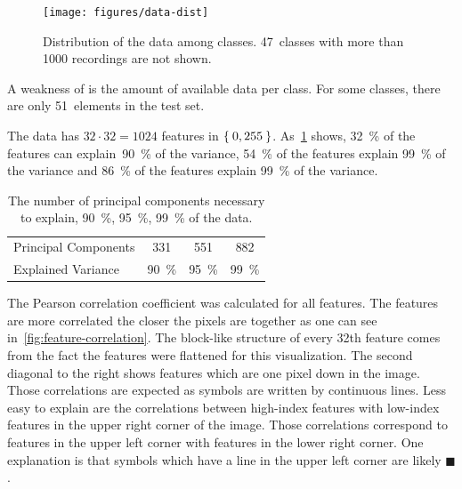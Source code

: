 \begin{figure}[h]
    \centering
    \texttt{[image: figures/data-dist]}
    \caption{Distribution of the data among classes. 47~classes with
             more than \num{1000} recordings are not shown.}
    \label{fig:class-data-distribution}
\end{figure}

A weakness of \dbNameVersion{} is the amount of available data per class. For
some classes, there are only 51~elements in the test set.

The data has $32\cdot 32 = 1024$ features in $\Set{0, 255}$.
As~\cref{table:pca-explained-variance} shows, \SI{32}{\percent} of the features
can explain~\SI{90}{\percent} of the variance, \SI{54}{\percent} of the
features explain \SI{99}{\percent} of the variance and \SI{86}{\percent} of the
features explain \SI{99}{\percent} of the variance.

\begin{table}[h]
    \centering
    \begin{tabular}{lccc}
    \toprule
    Principal Components &  331              & 551               & 882  \\
    Explained Variance   & \SI{90}{\percent} & \SI{95}{\percent} & \SI{99}{\percent} \\
    \bottomrule
    \end{tabular}
    \caption{The number of principal components necessary to explain,
             \SI{90}{\percent}, \SI{95}{\percent}, \SI{99}{\percent}
             of the data.}
    \label{table:pca-explained-variance}
\end{table}

The Pearson correlation coefficient was calculated for all features. The
features are more correlated the closer the pixels are together as one can see
in~\cref{fig:feature-correlation}. The block-like structure of every 32th
feature comes from the fact the features were flattened for this visualization.
The second diagonal to the right shows features which are one pixel down in the
image. Those correlations are expected as symbols are written by continuous
lines. Less easy to explain are the correlations between high-index
features with low-index features in the upper right corner of the image.
Those correlations correspond to features in the upper left corner with
features in the lower right corner. One explanation is that symbols which have
a line in the upper left corner are likely $\blacksquare$.

